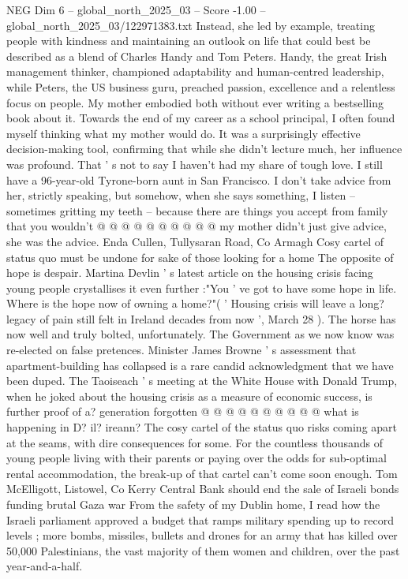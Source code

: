 \begin{textsample}{NEG Dim 6 – global\_north\_2025\_03 – Score -1.00 – global\_north\_2025\_03/122971383.txt}  \label{ex:f6_neg_230}
Instead, she led by example, treating people with kindness and maintaining an outlook on life that could best be described as a blend of Charles Handy and Tom Peters.
Handy, the great Irish management thinker, championed adaptability and human-centred leadership, while Peters, the US business guru, preached passion, excellence and a relentless focus on people.
My mother embodied both without ever writing a bestselling book about it.
Towards the end of my career as a school principal, I often found myself thinking what my mother would do.
It was a surprisingly effective decision-making tool, confirming that while she didn't lecture much, her influence was profound.
That ' s not to say I haven't had my share of tough love.
I still have a 96-year-old Tyrone-born aunt in San Francisco.
I don't take advice from her, strictly speaking, but somehow, when she says something, I listen -- sometimes gritting my teeth -- because there are things you accept from family that you wouldn't @ @ @ @ @ @ @ @ @ @ my mother didn't just give advice, she was the advice.
Enda Cullen, Tullysaran Road, Co Armagh Cosy cartel of status quo must be undone for sake of those looking for a home The opposite of hope is despair.
Martina Devlin ' s latest article on the housing crisis facing young people crystallises it even further :"You ' ve got to have some hope in life.
Where is the hope now of owning a home?"( ' Housing crisis will leave a long? legacy of pain still felt in Ireland decades from now ', March 28 ).
The horse has now well and truly bolted, unfortunately.
The Government as we now know was re-elected on false pretences.
Minister James Browne ' s assessment that apartment-building has collapsed is a rare candid acknowledgment that we have been duped.
The Taoiseach ' s meeting at the White House with Donald Trump, when he joked about the housing crisis as a measure of economic success, is further proof of a? generation forgotten @ @ @ @ @ @ @ @ @ @ what is happening in D? il? ireann?
The cosy cartel of the status quo risks coming apart at the seams, with dire consequences for some.
For the countless thousands of young people living with their parents or paying over the odds for sub-optimal rental accommodation, the break-up of that cartel can't come soon enough.
Tom McElligott, Listowel, Co Kerry Central Bank should end the sale of Israeli bonds funding brutal Gaza war From the safety of my Dublin home, I read how the Israeli parliament approved a budget that ramps military spending up to record levels ; more bombs, missiles, bullets and drones for an army that has killed over 50,000 Palestinians, the vast majority of them women and children, over the past year-and-a-half.

\end{textsample}
